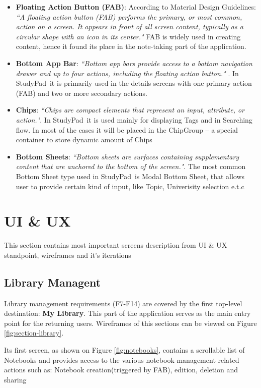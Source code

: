 \documentclass[thesis=B,english]{FITthesis}[2012/10/20]
\newcommand{\appname}{StudyPad}
\newcommand{\quoting}[1]{\textit{``#1"}}
\begin{document}
\begin{itemize}
	\item \textbf{Floating Action Button (FAB)}: According to Material Design Guidelines: \quoting{A floating action button (FAB) performs the primary, or most common, action on a screen. It appears in front of all screen content, typically as a circular shape with an icon in its center.} \cite{material-fab} FAB is widely used in creating content, hence it found its place in the note-taking part of the application.
	\item \textbf{Bottom App Bar}: \quoting{Bottom app bars provide access to a bottom navigation drawer and up to four actions, including the floating action button.} \cite{material-bottomappbar}. In \appname\ it is primarily used in the details screens with one primary action (FAB) and two or more secondary actions.
	\item \textbf{Chips}: \quoting{Chips are compact elements that represent an input, attribute, or action.}\cite{material-chips}. In \appname\ it is used mainly for displaying Tags and in Searching flow. In most of the cases it will be placed in the ChipGroup -- a special container to store dynamic amount of Chips
	\item \textbf{Bottom Sheets}: \quoting{Bottom sheets are surfaces containing supplementary content that are anchored to the bottom of the screen.}. The most common Bottom Sheet type used in \appname\ is Modal Bottom Sheet, that allows user to provide certain kind of input, like Topic, Univerisity selection e.t.c
	\end{itemize}

\section{UI \& UX}

This section contains most important screens description from UI \& UX standpoint, wireframes and it's iterations

\subsection{Library Managent}
Library management requirements (F7-F14) are covered by the first top-level destination: \textbf{My Library}. This part of the application serves as the main entry point for the returning users. Wireframes of this sections can be viewed on Figure \ref{fig:section-library}.
	
	Its first screen, as shown on Figure \ref{fig:notebooks}, contains a scrollable list of Notebooks and provides access to the various notebook-management related actions such as: Notebook creation(triggered by FAB), edition, deletion and sharing
		
\end{document}
